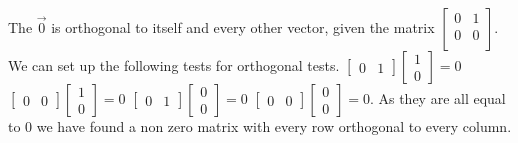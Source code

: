 	The $\vec{0}$ is orthogonal to itself and every other vector, given the matrix $\begin{bmatrix}
				    0 & 1 \\
				    0 & 0 \\
				\end{bmatrix}$. We can set up the following tests for orthogonal tests.
				\newline
				$\begin{bmatrix}
				    0 & 1
				\end{bmatrix}\begin{bmatrix}
                    1 \\
                    0
				\end{bmatrix} =  0$
				\newline
				$\begin{bmatrix}
				    0 & 0
				\end{bmatrix}\begin{bmatrix}
                    1 \\
                    0
				\end{bmatrix} =  0$
				\newline
				$\begin{bmatrix}
				    0 & 1
				\end{bmatrix}\begin{bmatrix}
                    0 \\
                    0
				\end{bmatrix} =  0$
				\newline
				$\begin{bmatrix}
				    0 & 0
				\end{bmatrix}\begin{bmatrix}
                    0 \\
                    0
				\end{bmatrix} =  0$.
				\newline
				As they are all equal to 0 we have found a non zero matrix with every row orthogonal to every column.
